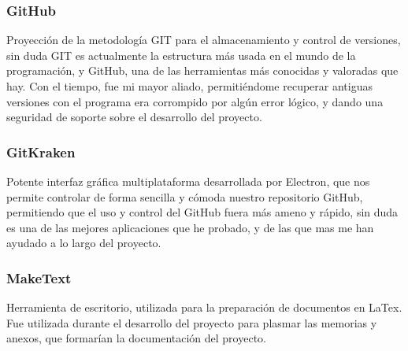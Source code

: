 \subsubsection{GitHub}
Proyección de la metodología GIT para el almacenamiento y control de versiones, sin duda GIT es actualmente la estructura más usada en el mundo de la programación, y GitHub, una de las herramientas más conocidas y valoradas que hay.  Con el tiempo, fue mi mayor aliado, permitiéndome recuperar antiguas versiones con el programa era corrompido por algún error lógico, y dando una seguridad de soporte sobre el desarrollo del proyecto.
\subsubsection{GitKraken}
Potente interfaz gráfica multiplataforma desarrollada por Electron, que nos permite controlar de forma sencilla y cómoda nuestro repositorio GitHub, permitiendo que el uso y control del GitHub fuera más ameno y rápido, sin duda es una de las mejores aplicaciones que he probado, y de las que mas me han ayudado a lo largo del proyecto.
\subsubsection{MakeText}
Herramienta de escritorio, utilizada para la preparación de documentos en LaTex. Fue utilizada durante el desarrollo del proyecto para plasmar las memorias y anexos, que formarían la documentación del proyecto.

